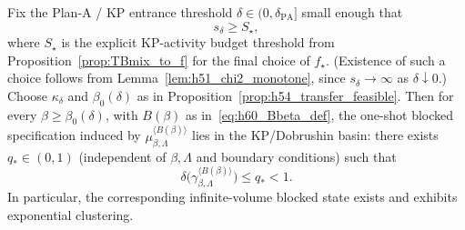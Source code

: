 \begin{theorem}
\label{thm:h60_one_shot_entrance}
Fix the Plan-A / KP entrance threshold $\delta\in(0,\delta_{\mathrm{PA}}]$ small enough that
\[
s_{\delta}\ge S_\star,
\]
where $S_\star$ is the explicit KP-activity budget threshold from Proposition~\ref{prop:TBmix_to_f} for the final choice of $f_\star$.
(Existence of such a choice follows from Lemma~\ref{lem:h51_chi2_monotone}, since $s_\delta\to\infty$ as $\delta\downarrow0$.)
Choose $\kappa_{\delta}$ and $\beta_0(\delta)$ as in Proposition~\ref{prop:h54_transfer_feasible}.
Then for every $\beta\ge \beta_0(\delta)$, with $B(\beta)$ as in~\eqref{eq:h60_Bbeta_def}, the one-shot blocked
specification induced by $\mu_{\beta,\Lambda}^{\langle B(\beta)\rangle}$ lies in the KP/Dobrushin basin:
there exists $q_\ast\in(0,1)$ (independent of $\beta,\Lambda$ and boundary conditions) such that
\begin{equation}
\label{eq:h60_kp_contraction}
\delta\bigl(\gamma^{\langle B(\beta)\rangle}_{\beta,\Lambda}\bigr)\le q_\ast<1.
\end{equation}
In particular, the corresponding infinite-volume blocked state exists and exhibits exponential clustering.
\end{theorem}

